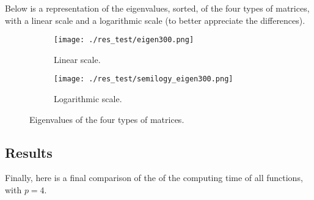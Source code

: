 \documentclass{article}
\begin{document}
Below is a representation of the eigenvalues, sorted, of the four types of matrices, with a linear scale and a logarithmic scale (to better appreciate the differences).

\begin{figure}[H]
    \centering
    \begin{subfigure}[b]{0.4\linewidth}
        \texttt{[image: ./res\_test/eigen300.png]}
            \caption{Linear scale.}
    \end{subfigure}
    \begin{subfigure}[b]{0.4\linewidth}
        \texttt{[image: ./res\_test/semilogy\_eigen300.png]}
            \caption{Logarithmic scale.}
    \end{subfigure}
    \caption{Eigenvalues of the four types of matrices.}
    \label{fig:eigenvalues}
\end{figure}


\subsection{Results}

    Finally, here is a final comparison of the of the computing time of all functions, with $p=4$.
\end{document}
